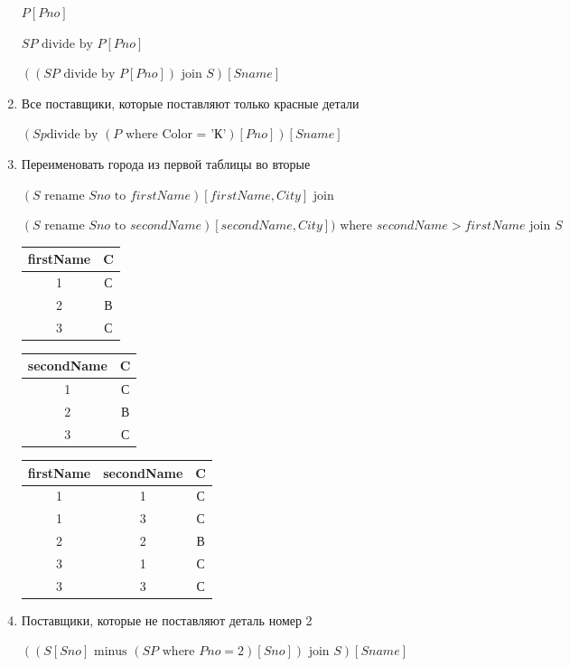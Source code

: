 \documentclass[a4paper, 14pt]{report}
\begin{document}
\begin{enumerate}
        $P[Pno]$

        $SP \text{ divide by } P[Pno]$

        $((SP \text{ divide by } P[Pno]) \text{ join } S)[Sname]$

    \item Все поставщики, которые поставляют только красные детали

        $(Sp \text{divide by }(P \text{ where } \text{Color = 'К'})[Pno])[Sname]$

    \item Переименовать города из первой таблицы во вторые

        $(S \text{ rename } Sno \text{ to } firstName)[firstName, City] \text{ join }$

        $(S \text{ rename } Sno \text{ to } secondName)[secondName, City]) \text{ where } secondName > firstName \text{ join } S$

        \begin{tabular}{|c|c|}
            \hline
            firstName & C \\
            \hline
            1 & С \\
            2 & В \\
            3 & С \\
            \hline
        \end{tabular}

        \begin{tabular}{|c|c|}
            \hline
            secondName & C \\
            \hline
            1 & С \\
            2 & В \\
            3 & С \\
            \hline
        \end{tabular}

        \begin{tabular}{|c|c|c|}
            \hline
            firstName & secondName & C \\
            \hline
            1 & 1 & С \\
            1 & 3 & С \\
            2 & 2 & В \\
            3 & 1 & С \\
            3 & 3 & С \\
            \hline
        \end{tabular}

    \item Поставщики, которые не поставляют деталь номер 2

        $((S[Sno] \text{ minus } (SP \text{ where } Pno=2)[Sno]) \text{ join } S)[Sname]$

\end{enumerate}
\end{document}
